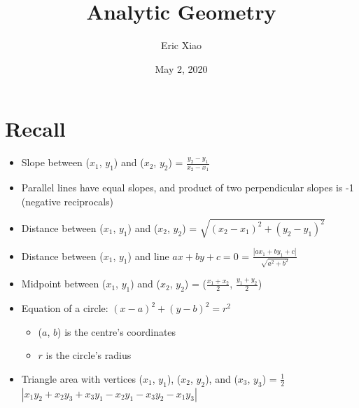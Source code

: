 \documentclass[12pt]{extarticle}
\title{Analytic Geometry}
\author{Eric Xiao}
\date{May 2, 2020}
\begin{document}
\maketitle

\section{Recall}
\begin{itemize}
    \item {Slope between ($x_1$, $y_1$) and ($x_2$, $y_2$) = $\frac{y_2 - y_1}{x_2 - x_1}$}
    \item {Parallel lines have equal slopes, and product of two perpendicular slopes is -1 (negative reciprocals)}
    \item {Distance between ($x_1$, $y_1$) and ($x_2$, $y_2$) = $\sqrt{(x_2 - x_1)^2 + (y_2 - y_1)^2}$}
    \item {Distance between ($x_1$, $y_1$) and line $ax + by + c = 0$ = $\frac{|ax_1 + by_1 + c|}{\sqrt{a^2 + b^2}}$}
    \item {Midpoint between ($x_1$, $y_1$) and ($x_2$, $y_2$) = ($\frac{x_1 + x_2}{2}$, $\frac{y_1 + y_2}{2}$)}
    \item {Equation of a circle: $(x-a)^2 + (y-b)^2 = r^2$
    \begin{itemize}
        \item {($a$, $b$) is the centre's coordinates}
        \item {$r$ is the circle's radius}
    \end{itemize}}
    \item {Triangle area with vertices ($x_1$, $y_1$), ($x_2$, $y_2$), and ($x_3$, $y_3$) = $\frac{1}{2}$$|x_1y_2 + x_2y_3 + x_3y_1 - x_2y_1 - x_3y_2 - x_1y_3|$}
\end{itemize}
\end{document}
